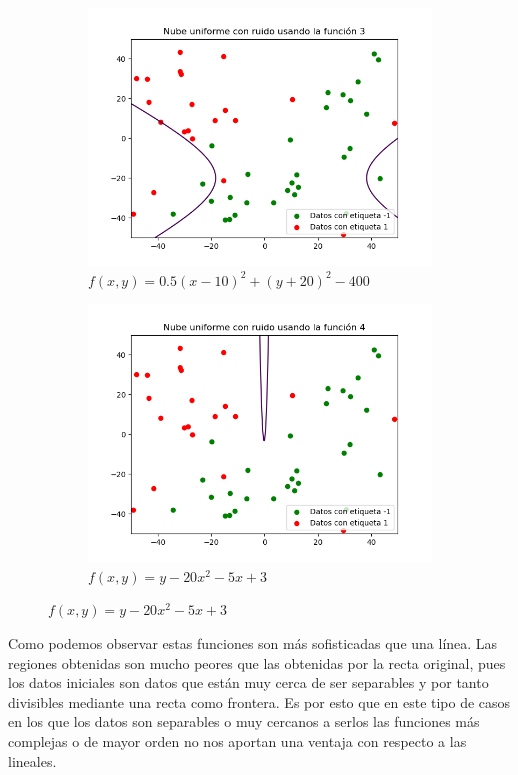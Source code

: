 \documentclass[12pt,a4paper]{article}
\begin{document}
\begin{figure}[H]
	\centering
	\begin{subfigure}{0.49\textwidth}
		\includegraphics[scale=0.55]{./Imagenes/ej1-7.png}
		\caption{$f(x,y) = 0.5(x-10)^2 + (y+20)^2 - 400$}
	\end{subfigure}
	\begin{subfigure}{0.49\textwidth}
		\includegraphics[scale=0.55]{./Imagenes/ej1-8.png}
		\caption{$f(x,y) = y-20x^2-5x+3$}
	\end{subfigure}
\end{figure}

Como podemos observar estas funciones son más sofisticadas que una línea. Las regiones obtenidas son mucho peores que las obtenidas por la recta original, pues los datos iniciales son datos que están muy cerca de ser separables y por tanto divisibles mediante una recta como frontera. Es por esto que en este tipo de casos en los que los datos son separables o muy cercanos a serlos las funciones más complejas o de mayor orden no nos aportan una ventaja con respecto a las lineales.
\end{document}
